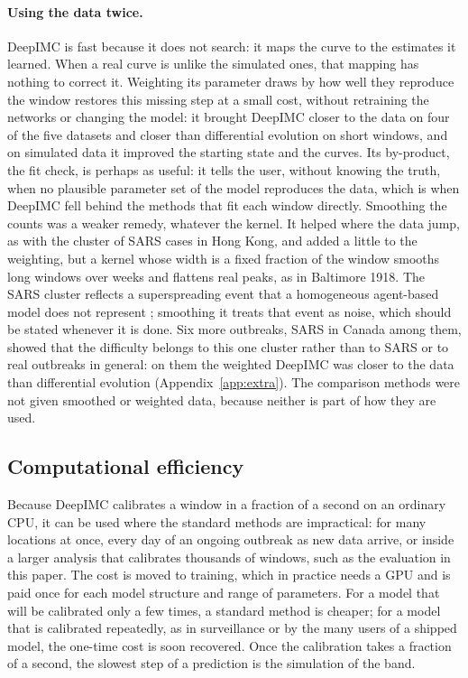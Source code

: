 \documentclass[12pt]{article}
\begin{document}
\paragraph{Using the data twice.} DeepIMC is fast because it does not search: it maps the curve to the estimates it
learned. When a real curve is unlike the simulated ones, that mapping has nothing to correct it. Weighting its
parameter draws by how well they reproduce the window restores this missing step at a small cost, without
retraining the networks or changing the model: it brought DeepIMC closer to the data on four of the five
datasets and closer than differential evolution on short windows, and on simulated data it improved the starting
state and the curves. Its by-product, the fit check, is perhaps as useful: it tells the user, without knowing
the truth, when no plausible parameter set of the model reproduces the data, which is when DeepIMC fell behind the
methods that fit each window directly. Smoothing the counts was a weaker remedy, whatever the kernel. It helped
where the data jump, as with the cluster of SARS cases in Hong Kong, and added a little to the weighting, but a
kernel whose width is a fixed fraction of the window smooths long windows over weeks and flattens real peaks, as
in Baltimore 1918. The SARS cluster reflects a
superspreading event that a homogeneous agent-based model does not represent \autocite{yu2004evidence}; smoothing it
treats that event as noise, which should be stated whenever it is done. Six more outbreaks, SARS in Canada among
them, showed that the difficulty belongs to this one cluster rather than to SARS or to real outbreaks in general:
on them the weighted DeepIMC was closer to the data than differential evolution (Appendix~\ref{app:extra}). The comparison methods were not given smoothed or weighted
data, because neither is part of how they are used.

\subsection{Computational efficiency}

Because DeepIMC calibrates a window in a fraction of a second on an ordinary CPU, it can be used where the
standard methods are impractical: for many locations at once, every day of an ongoing outbreak as new
data arrive, or inside a larger analysis that calibrates thousands of windows, such as the evaluation in
this paper. The cost is moved to training, which in practice needs a GPU and is paid once for each model
structure and range of parameters. For a model that will be calibrated only a few times, a standard
method is cheaper; for a model that is calibrated repeatedly, as in surveillance or by the many users of
a shipped model, the one-time cost is soon recovered. Once the calibration takes a fraction of a second,
the slowest step of a prediction is the simulation of the band.
\end{document}
